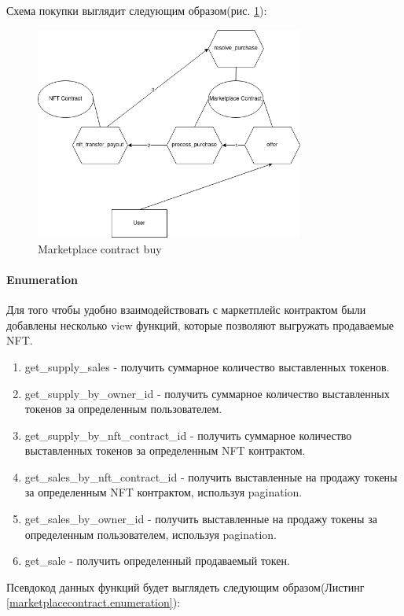 Схема покупки выглядит следующим образом(рис. {\color{blue}\ref{marketplacecontract.buypng}}):

\begin{figure}[h]
	\centering
	\includegraphics[height=70mm]{fig/buy.png}
	\caption{Marketplace contract buy}
    \label{marketplacecontract.buypng}
\end{figure}

\paragraph{Enumeration}

Для того чтобы удобно взаимодействовать с маркетплейс контрактом были добавлены несколько view функций, которые позволяют выгружать продаваемые NFT.
\begin{enumerate}
\item get\_supply\_sales - получить суммарное количество выставленных токенов.
\item get\_supply\_by\_owner\_id - получить суммарное количество выставленных токенов за определенным пользователем.
\item get\_supply\_by\_nft\_contract\_id - получить суммарное количество выставленных токенов за определенным NFT контрактом.
\item get\_sales\_by\_nft\_contract\_id - получить выставленные на продажу токены за определенным NFT контрактом, используя pagination.
\item get\_sales\_by\_owner\_id - получить выставленные на продажу токены за определенным пользователем, используя pagination.
\item get\_sale - получить определенный продаваемый токен.
\end{enumerate}

Псевдокод данных функций будет выглядеть следующим образом(Листинг {\color{blue}\ref{marketplacecontract.enumeration}}):

